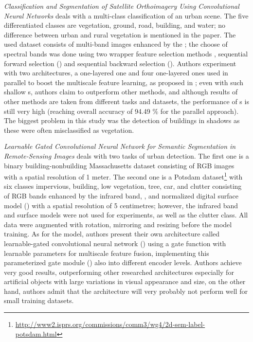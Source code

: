\textit{Classification and Segmentation of Satellite Orthoimagery Using Convolutional Neural Networks} deals with a multi-class classification of an urban scene. The five differentiated classes are vegetation, ground, road, building, and water; no difference between urban and rural vegetation is mentioned in the paper. The used dataset consists of multi-band images enhanced by the ; the choose of spectral bands was done using two wrapper feature selection methods \cite{wrapper-feature-selection}, sequential forward selection () and sequential backward selection (). Authors experiment with two  architectures, a one-layered one and four one-layered ones used in parallel to boost the multiscale feature learning, as proposed in \cite{multiscale-parallel-cnn}; even with such shallow s, authors claim to outperform other  methods, and although results of other methods are taken from different tasks and datasets, the performance of s is still very high (reaching overall accuracy of 94.49 \% for the parallel approach). The biggest problem in this study was the detection of buildings in shadows as these were often misclassified as vegetation.

\textit{Learnable Gated Convolutional Neural Network for Semantic Segmentation in Remote-Sensing Images} deals with two tasks of urban detection. The first one is a binary building-nonbuilding Massachusetts dataset \cite{massachusetts-dataset} consisting of RGB images with a spatial resolution of 1 meter. The second one is a Potsdam dataset\footnote{\url{http://www2.isprs.org/commissions/comm3/wg4/2d-sem-label-potsdam.html}} with six classes impervious, building, low vegetation, tree, car, and clutter consisting of RGB bands enhanced by the infrared band, , and normalized digital surface model () with a spatial resolution of 5 centimetres; however, the infrared band and surface models were not used for experiments, as well as the clutter class. All data were augmented with rotation, mirroring and resizing before the model training. As for the model, authors present their own architecture called learnable-gated convolutional neural network () using a gate function with learnable parameters for multiscale feature fusion, implementing this parameterized gate module () also into different encoder levels. Authors achieve very good results, outperforming other researched architectures especially for artificial objects with large variations in visual appearance and size, on the other hand, authors admit that the architecture will very probably not perform well for small training datasets.

